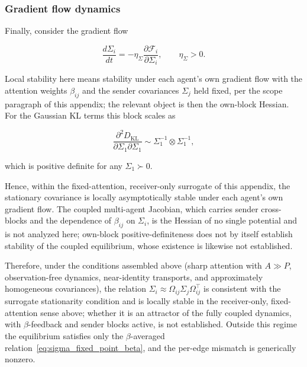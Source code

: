 \documentclass[11pt]{article}
\begin{document}
\subsubsection{Gradient flow dynamics}

Finally, consider the gradient flow

\begin{equation}
\frac{d\Sigma_i}{dt}
=-\eta_\Sigma
\frac{\partial \mathcal{F}_i}{\partial \Sigma_i},
\qquad\eta_\Sigma > 0.
\end{equation}

Local stability here means stability under each agent's own gradient flow with the attention weights $\beta_{ij}$ and the sender covariances $\Sigma_j$ held fixed, per the scope paragraph of this appendix; the relevant object is then the own-block Hessian. For the Gaussian KL terms this block scales as

\begin{equation}
\frac{\partial^2 D_{\mathrm{KL}}}{\partial \Sigma_1  \partial \Sigma_1}
\sim
\Sigma_1^{-1} \otimes \Sigma_1^{-1},
\end{equation}

which is positive definite for any $\Sigma_1 \succ 0$.

Hence, within the fixed-attention, receiver-only surrogate of this appendix, the stationary covariance is locally asymptotically stable under each agent's own gradient flow. The coupled multi-agent Jacobian, which carries sender cross-blocks and the dependence of $\beta_{ij}$ on $\Sigma_i$, is the Hessian of no single potential and is not analyzed here; own-block positive-definiteness does not by itself establish stability of the coupled equilibrium, whose existence is likewise not established.

Therefore, under the conditions assembled above (sharp attention with $A \gg P$, observation-free dynamics, near-identity transports, and approximately homogeneous covariances), the relation $\Sigma_i \approx\Omega_{ij}\Sigma_j\Omega_{ij}^\top$ is consistent with the surrogate stationarity condition and is locally stable in the receiver-only, fixed-attention sense above; whether it is an attractor of the fully coupled dynamics, with $\beta$-feedback and sender blocks active, is not established. Outside this regime the equilibrium satisfies only the $\beta$-averaged relation~\eqref{eq:sigma_fixed_point_beta}, and the per-edge mismatch is generically nonzero.
\end{document}
